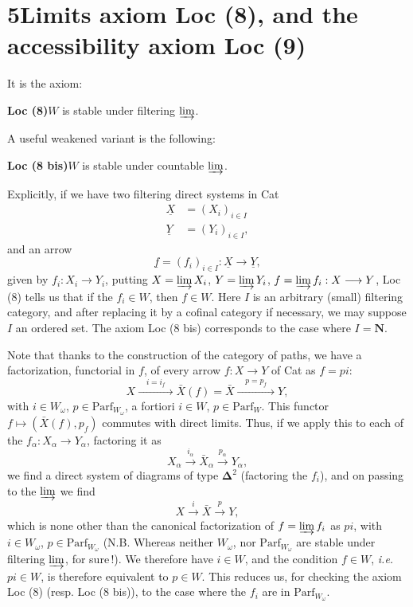 \documentclass[11pt]{article}
\newcommand{\printedpage}[1]{\marginpar{\footnotesize p.~#1}}
\newcommand{\msp}[1]{\marginpar{\footnotesize [#1]}}
\newcommand{\Parf}{\mathrm{Parf}}
\begin{document}
\msp{page 71}

\printedpage{40}

\section*{5\quad Limits axiom Loc (8), and the accessibility axiom Loc (9)}

It is the axiom:

\textbf{Loc (8)}\quad $W$ is stable under filtering $\varinjlim$.

A useful weakened variant is the following:

\textbf{Loc (8 bis)}\quad $W$ is stable under countable $\varinjlim$.

Explicitly, if we have two filtering direct systems in Cat
\[
\begin{aligned}
\underline{X} &= (X_i)_{i\in I}\\
\underline{Y} &= (Y_i)_{i\in I},
\end{aligned}
\]
and an arrow
\[
\underline{f} = (f_i)_{i\in I} : \underline{X} \longrightarrow \underline{Y},
\]
given by $f_i : X_i \longrightarrow Y_i$, putting $X = \varinjlim X_i$, $Y = \varinjlim Y_i$, $f = \varinjlim f_i : X \longrightarrow Y$, Loc (8) tells us that if the $f_i \in W$, then $f \in W$. Here $I$ is
\msp{page 72}
an arbitrary (small) filtering category, and after replacing it by a cofinal category if necessary, we may suppose $I$ an ordered set. The axiom Loc (8 bis) corresponds to the case where $I = \mathbf{N}$.

Note that thanks to the construction of the category of paths, we have a factorization, functorial in $f$, of every arrow $f : X \longrightarrow Y$ of Cat as $f = pi$:
\[
X \xrightarrow{\quad i = i_f\quad} \bar{X}(f) = \bar{X} \xrightarrow{\quad p = p_f\quad} Y,
\]
with $i \in W_\omega$, $p \in \Parf_{W_\omega}$, a fortiori $i \in W$, $p \in \Parf_W$. This functor $f \longmapsto (\bar{X}(f), p_f)$ commutes with direct limits. Thus, if we apply this to each of the $f_\alpha : X_\alpha \longrightarrow Y_\alpha$, factoring it as
\[
X_\alpha \xrightarrow{i_\alpha} \bar{X}_\alpha \xrightarrow{p_\alpha} Y_\alpha,
\]
we find a direct system of diagrams of type $\boldsymbol{\Delta}^2$ (factoring the $f_i$), and on passing to the $\varinjlim$ we find
\[
X \xrightarrow{i} \bar{X} \xrightarrow{p} Y,
\]
which is none other than the canonical factorization
\msp{page 73}
of $f = \varinjlim f_i$ as $pi$, with $i \in W_\omega$, $p \in \Parf_{W_\omega}$ (N.B. Whereas neither $W_\omega$, nor $\Parf_{W_\omega}$ are stable under filtering $\varinjlim$, for sure\,!). We therefore have $i \in W$, and the condition $f \in W$, \textit{i.e.} $pi \in W$, is therefore equivalent to $p \in W$. This reduces us, for checking the axiom Loc (8) (resp. Loc (8 bis)), to the case where the $f_i$ are in $\Parf_{W_\omega}$.
\end{document}
